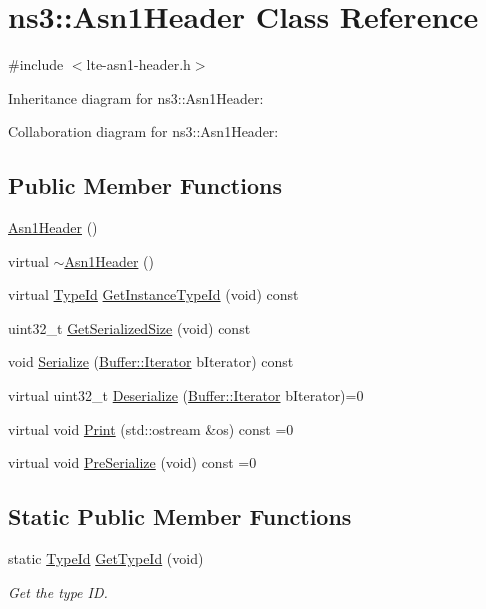 \hypertarget{classns3_1_1Asn1Header}{}\section{ns3\+:\+:Asn1\+Header Class Reference}
\label{classns3_1_1Asn1Header}


{\ttfamily \#include $<$lte-\/asn1-\/header.\+h$>$}



Inheritance diagram for ns3\+:\+:Asn1\+Header\+:


Collaboration diagram for ns3\+:\+:Asn1\+Header\+:
\subsection*{Public Member Functions}
\begin{DoxyCompactItemize}
\item 
\hyperlink{classns3_1_1Asn1Header_af4e2509877b5cfdba993b31139372fb3}{Asn1\+Header} ()
\item 
virtual \hyperlink{classns3_1_1Asn1Header_a573bc58b90c86be4580d03b5f6489027}{$\sim$\+Asn1\+Header} ()
\item 
virtual \hyperlink{classns3_1_1TypeId}{Type\+Id} \hyperlink{classns3_1_1Asn1Header_afd94efab3e574be7c936d06b0c52ed5f}{Get\+Instance\+Type\+Id} (void) const 
\item 
uint32\+\_\+t \hyperlink{classns3_1_1Asn1Header_a18a67eb7869c5784f59d197bbd76a74f}{Get\+Serialized\+Size} (void) const 
\item 
void \hyperlink{classns3_1_1Asn1Header_a47fb5c71efa489ff47020e8bd4e44c1d}{Serialize} (\hyperlink{classns3_1_1Buffer_1_1Iterator}{Buffer\+::\+Iterator} b\+Iterator) const 
\item 
virtual uint32\+\_\+t \hyperlink{classns3_1_1Asn1Header_a4664472c9288585a19f4f92202f490c0}{Deserialize} (\hyperlink{classns3_1_1Buffer_1_1Iterator}{Buffer\+::\+Iterator} b\+Iterator)=0
\item 
virtual void \hyperlink{classns3_1_1Asn1Header_a8b7c035ddfef790a32477dc8895ea99b}{Print} (std\+::ostream \&os) const =0
\item 
virtual void \hyperlink{classns3_1_1Asn1Header_a93ff29103b4090ed77666e3ac3aeae19}{Pre\+Serialize} (void) const =0
\end{DoxyCompactItemize}
\subsection*{Static Public Member Functions}
\begin{DoxyCompactItemize}
\item 
static \hyperlink{classns3_1_1TypeId}{Type\+Id} \hyperlink{classns3_1_1Asn1Header_ac8f4e7b057d7bb045aaa8e5198347f5c}{Get\+Type\+Id} (void)
\begin{DoxyCompactList}\small\item\em Get the type ID. \end{DoxyCompactList}\end{DoxyCompactItemize}
